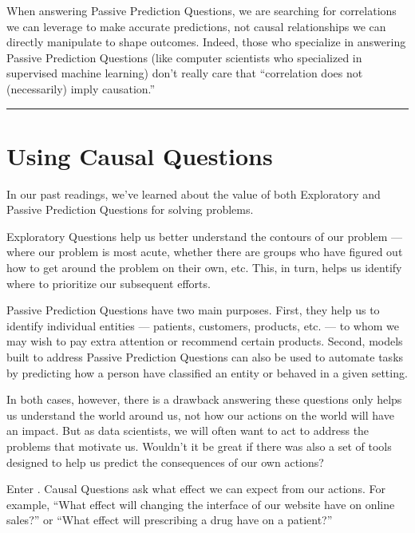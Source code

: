 \documentclass[letterpaper,10pt,english]{jupyterBook}
\begin{document}
\sphinxAtStartPar
When answering Passive Prediction Questions, we are searching for correlations we can leverage to make accurate predictions, not causal relationships we can directly manipulate to shape outcomes. Indeed, those who specialize in answering Passive Prediction Questions (like computer scientists who specialized in supervised machine learning) don’t really care that “correlation does not (necessarily) imply causation.”

\sphinxAtStartPar
{}


\bigskip\hrule\bigskip


\sphinxstepscope


\chapter{Using Causal Questions}
\label{\detokenize{30_questions/35_using_causal_questions:using-causal-questions}}\label{\detokenize{30_questions/35_using_causal_questions::doc}}
\sphinxAtStartPar
In our past readings, we’ve learned about the value of both Exploratory and Passive Prediction Questions for solving problems.

\sphinxAtStartPar
Exploratory Questions help us better understand the contours of our problem — where our problem is most acute, whether there are groups who have figured out how to get around the problem on their own, etc. This, in turn, helps us identify where to prioritize our subsequent efforts.

\sphinxAtStartPar
Passive Prediction Questions have two main purposes. First, they help us to identify individual entities — patients, customers, products, etc. — to whom we may wish to pay extra attention or recommend certain products. Second, models built to address Passive Prediction Questions can also be used to automate tasks by predicting how a person  have classified an entity or behaved in a given setting.

\sphinxAtStartPar
In both cases, however, there is a drawback \sphinxhyphen{} answering these questions only helps us understand the world around us, not how our actions on the world will have an impact. But as data scientists, we will often want to act to address the problems that motivate us. Wouldn’t it be great if there was also a set of tools designed to help us predict the consequences of our own actions?

\sphinxAtStartPar
Enter . Causal Questions ask what effect we can expect from our actions. For example, “What effect will changing the interface of our website have on online sales?” or “What effect will prescribing a drug have on a patient?”
\end{document}

